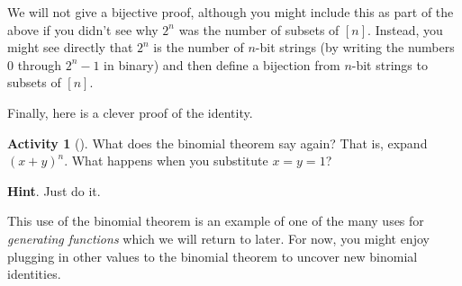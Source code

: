\documentclass[10pt,]{book}
\theoremstyle{plain}
\theoremstyle{definition}
\theoremstyle{definition}
\theoremstyle{definition}
\newtheorem{activity}[project]{Activity}
\numberwithin{equation}{chapter}
\begin{document}
\hypertarget{p-587}{}%
We will not give a bijective proof, although you might include this as part of the above if you didn't see why \(2^n\) was the number of subsets of \([n]\).  Instead, you might see directly that \(2^n\) is the number of \(n\)-bit strings (by writing the numbers 0 through \(2^n - 1\) in binary) and then define a bijection from \(n\)-bit strings to subsets of \([n]\).%
\par
\hypertarget{p-588}{}%
Finally, here is a clever proof of the identity.%
\begin{activity}[]\label{act-pascalrowsum-binom}
\hypertarget{p-589}{}%
What does the binomial theorem say again?  That is, expand \((x+y)^n\).  What happens when you substitute \(x = y = 1\)?%
\par\smallskip%
\noindent\textbf{Hint}.\hypertarget{hint-36}{}\quad%
\hypertarget{p-590}{}%
Just do it.%
\end{activity}
\hypertarget{p-591}{}%
This use of the binomial theorem is an example of one of the many uses for \emph{generating functions} which we will return to later.  For now, you might enjoy plugging in other values to the binomial theorem to uncover new binomial identities.%
\typeout{************************************************}
\typeout{************************************************}
\end{document}
